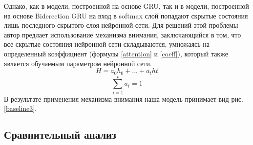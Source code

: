     Однако, как в модели, построенной на основе GRU, так и в модели, построенной на основе Biderection GRU на вход в softmax слой попадают скрытые состояния лишь последного скрытого слоя нейронной сети. Для решений этой проблемы автор предлает использование механизма внимания, заключающийся в том, что все скрытые состояния нейронной сети складываются, умножаясь на определенный коэффициент (формулы \ref{attention} и \ref{coeff}), который также является обучаемым параметром нейронной сети.
    \begin{equation}\label{attention}
    H = a_{0}h_{0}+...+a_{t}h{t}
    \end{equation}
    \begin{equation}\label{coeff}
    \sum_{i=1}^{t} a_{i}=1
    \end{equation}
    В результате применения механизма внимания наша модель принимает вид рис. \ref{baseline3}.

    \subsection{Сравнительный анализ}\label{compare}
\clearpage